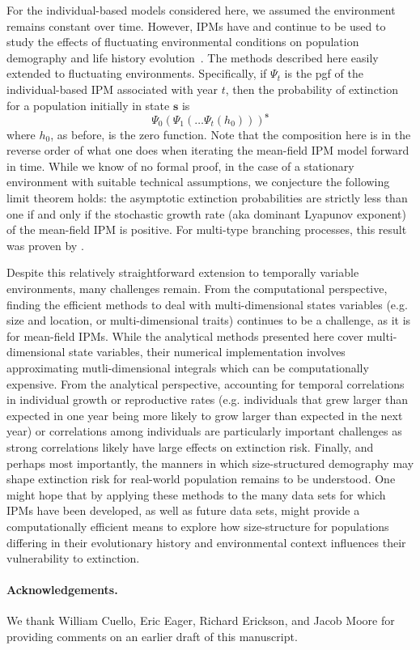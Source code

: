 \documentclass[12pt]{amsart}\usepackage[]{graphicx}\usepackage[]{color}
\def\s{\mathbf s}
\begin{document}
For the individual-based models considered here, we assumed the environment remains constant over time. However, IPMs have and continue to be used to study the effects of fluctuating environmental conditions on population demography and life history evolution~\citep{childs-etal-04,dahlgren-ehrlen-11,rees-ellner-09}. The methods described here easily extended to fluctuating environments. Specifically, if $\Psi_t$ is the pgf of the individual-based IPM associated with year $t$, then the probability of extinction for a population initially in state $\s$ is
\[
\Psi_0(\Psi_1(\dots \Psi_t(h_0)))^\s
\]
where $h_0$, as before, is the zero function. Note that the composition here is in the reverse order of what one does when iterating the mean-field IPM model forward in time. While we know of no formal proof, in the case of a stationary environment with suitable technical assumptions, we conjecture the following limit theorem holds: the asymptotic extinction probabilities are strictly less than one if and only if the stochastic growth rate (aka dominant Lyapunov exponent) of the mean-field IPM is positive. For multi-type branching processes, this result was proven by \citet{tanny-81}.

Despite this relatively straightforward extension to temporally variable environments, many challenges remain. From the computational perspective, finding the efficient methods to deal with multi-dimensional states variables (e.g. size and location, or multi-dimensional traits) continues to be a challenge, as it is for mean-field IPMs. While the analytical methods presented here cover multi-dimensional state variables, their numerical implementation involves approximating mutli-dimensional integrals which can be computationally expensive. From the analytical perspective, accounting for temporal correlations in individual growth or reproductive rates (e.g. individuals that grew larger than expected in one year being more likely to grow larger than expected in the next year) or correlations among individuals are particularly important challenges as strong correlations likely have large effects on extinction risk.
Finally, and perhaps most importantly, the  manners in which size-structured demography may shape extinction risk for real-world population remains to be understood. One might hope that by applying these methods to the many data sets for which IPMs have been developed, as well as future data sets, might provide a computationally efficient means to explore how size-structure for populations differing in their evolutionary history and environmental context influences their vulnerability to extinction.

\vskip 0.1in
\paragraph{\bf Acknowledgements.} We thank William Cuello, Eric Eager, Richard Erickson, and Jacob Moore for providing comments on an earlier draft of this manuscript.

\end{document}
